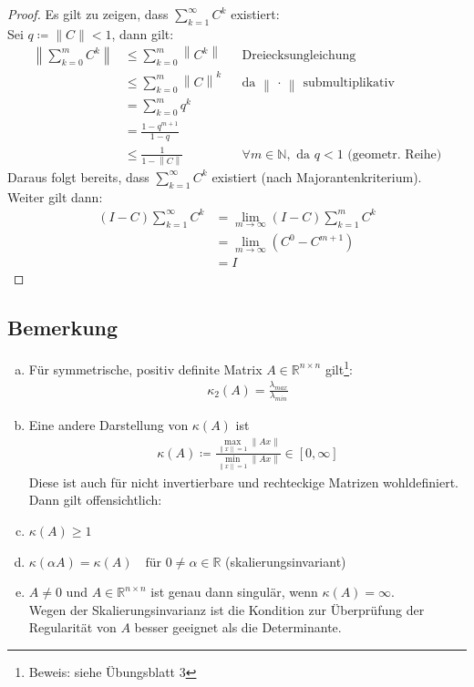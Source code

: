 \documentclass[ngerman,fontsize=11pt, paper=a4, parskip=half, titlepage=true, toc=bib]{scrbook}
\newcommand{\R}{\mathds{R}}
\newcommand{\Renn}{\mathds{R}^{n\times n}}
\newcommand{\N}{\mathds{N}}
\newcommand{\nn}[1]{\left\| #1 \right\|}
\begin{document}
  \begin{proof}
    Es gilt zu zeigen, dass $\sum_{k=1}^{\infty}C^k$ existiert: \\
    Sei $q\coloneqq \|C\| < 1$, dann gilt: 
    \begin{align*}
      \nn{ \sum_{k=0}^{m} C^k } &\leq \sum_{k=0}^{m} \nn{C^k }  && \text{Dreiecksungleichung} \\
                                &\leq \sum_{k=0}^{m}\nn{C}^k && \text{da $\nn{\,\cdot\,}$ submultiplikativ}\\
                                &=\sum_{k=0}^{m}q^k  \\
                                &= \frac{1-q^{m+1}}{1-q} \\
                                &\leq \frac{1}{1-\nn{C}} && \forall m\in \N, \text{ da } q<1 \text{ (geometr. Reihe)}
    \end{align*}
    Daraus folgt bereits, dass $\sum_{k=1}^{\infty}C^k$ existiert (nach Majorantenkriterium).\\
    Weiter gilt dann:
    \begin{align*}
      (I-C) \sum_{k=1}^{\infty}C^k &= \lim\limits_{m\rightarrow \infty}(I-C)   \sum_{k=1}^{m}C^k \\
                                   &= \lim\limits_{m\rightarrow \infty} (C^0-C^{m+1}) \\
                                   &=I 
    \end{align*}
  \end{proof}

  \subsection{Bemerkung}\label{3.2.13}
  \begin{enumerate}[a)]
  \item Für symmetrische, positiv definite Matrix $A\in \Renn$ gilt\footnote{Beweis: siehe Übungsblatt 3}: 
    \begin{gather}
      \kappa_2(A) = \frac{\lambda_{max}}{\lambda_{min}} \label{III.2.13}
    \end{gather}
  \item Eine andere Darstellung von $\kappa(A)$ ist
    \begin{gather}
      \kappa(A) \coloneqq 
      \frac{\underset{\|x\|=1}{\max}\|Ax\|}{\underset{\|x\|=1}{\min}\|Ax\|} \in  \left[ 0, \infty \right]
      \label{III.2.14}
    \end{gather}
    Diese ist auch für nicht invertierbare und rechteckige Matrizen wohldefiniert. \\
    Dann gilt offensichtlich:
  \item $\kappa(A) \geq 1$
  \item $\kappa(\alpha A)=\kappa(A) \quad \text{für } 0\neq\alpha\in\R$ (skalierungsinvariant)
  \item $A\neq 0$ und $A\in\Renn $ ist genau dann singulär, wenn $\kappa(A)=\infty$. \\
    Wegen der Skalierungsinvarianz ist die Kondition zur Überprüfung der Regularität von $A$ 
    besser geeignet als die Determinante.
  \end{enumerate}
  
\end{document}
